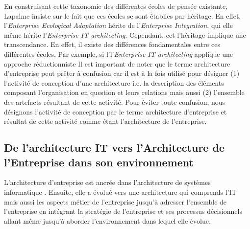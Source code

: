 %
%
%
%

En construisant cette taxonomie des différentes écoles de pensée existante, 
Lapalme insiste sur le fait que ces écoles se sont établies par héritage. En 
effet, l'\textit{Enterprise Ecological Adaptation} hérite de 
l'\textit{Enterprise Integration}, qui elle même hérite l'\textit{Enterprise IT 
architecting}. Cependant, cet l'héritage implique une transcendance. En effet, 
il existe des différences fondamentales entre ces différentes écoles. Par 
exemple, si l'l'\textit{Enterprise IT architecting} applique une approche 
réductionniste 
Il est important de noter que le terme architecture d'entreprise peut prêter à 
confusion car il est à la fois utilisé pour désigner (1) l'activité de 
conception d'une architecture i.e. la description des éléments composant 
l'organisation en question et leurs relations mais aussi (2) l'ensemble des 
artefacts résultant de cette activité. 
Pour éviter toute confusion, nous désignons l'activité de conception par le 
terme architecture d'entreprise et résultat de cette activité comme étant 
l'architecture de l'entreprise.



\subsection{De l'architecture IT vers l'Architecture de l'Entreprise dans son 
environnement}

L'architecture d'entreprise est ancrée dans l'architecture de systèmes 
informatique \cite{kappelman2008enterprise}. Ensuite, elle a évolué vers une 
architecture qui comprends l'IT mais aussi les aspects métier de l'entreprise 
\cite{winter2006essential}  jusqu'à adresser l'ensemble de l'entreprise en 
intégrant la stratégie de l'entreprise et ses processus décisionnels 
\cite{ross2006enterprise} allant même jusqu'à aborder l'environnement dans 
lequel elle évolue.

